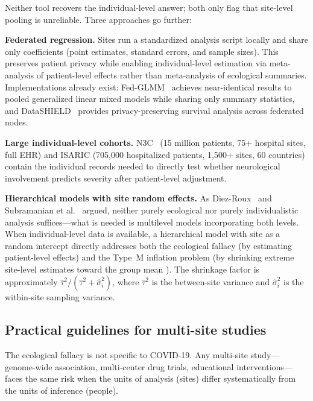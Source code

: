 \documentclass[11pt]{article}
\begin{document}
Neither tool recovers the individual-level answer; both only flag that
site-level pooling is unreliable.  Three approaches go further:

\textbf{Federated regression.}  Sites run a standardized analysis script
locally and share only coefficients (point estimates, standard errors, and
sample sizes).  This preserves patient privacy while enabling
individual-level estimation via meta-analysis of patient-level effects
rather than meta-analysis of ecological summaries.  Implementations already
exist: Fed-GLMM~\cite{chen2023fedglmm} achieves near-identical results to
pooled generalized linear mixed models while sharing only summary statistics,
and DataSHIELD~\cite{wilson2022datashield} provides privacy-preserving
survival analysis across federated nodes.

\textbf{Large individual-level cohorts.}  N3C~\cite{haendel2021n3c}
(15 million patients, 75+ hospital sites, full EHR) and ISARIC (705,000
hospitalized patients, 1,500+ sites, 60 countries) contain the individual
records needed to directly test whether neurological involvement predicts
severity after patient-level adjustment.

\textbf{Hierarchical models with site random effects.}  As
Diez-Roux~\cite{diezroux2000multilevel} and
Subramanian et al.~\cite{subramanian2009revisiting} argued, neither
purely ecological nor purely individualistic analysis suffices---what is
needed is multilevel models incorporating both levels.  When
individual-level data is available, a hierarchical model with site as a
random intercept directly addresses both the ecological fallacy (by
estimating patient-level effects) and the Type~M inflation problem (by
shrinking extreme site-level estimates toward the group mean
\cite{gelman2012multilevel}).  The shrinkage factor is approximately
$\hat\tau^2 / (\hat\tau^2 + \hat\sigma_i^2)$, where $\hat\tau^2$ is
the between-site variance and $\hat\sigma_i^2$ is the within-site
sampling variance.

\subsection{Practical guidelines for multi-site studies}

The ecological fallacy is not specific to COVID-19.  Any multi-site
study---genome-wide association, multi-center drug trials, educational
interventions---faces the same risk when the units of analysis (sites)
differ systematically from the units of inference (people).
\end{document}
